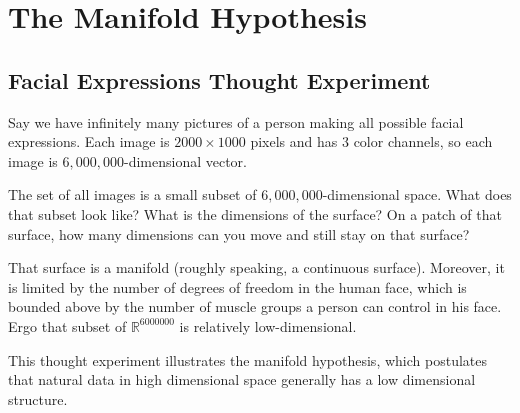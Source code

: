 \chapter{The Manifold Hypothesis}\label{chp: manifold_hypothesis}

\section{Facial Expressions Thought Experiment}

Say we have infinitely many pictures of a person making all possible facial expressions.
Each image is $2000 \times 1000$ pixels and has $3$ color channels, so each image is $6,000,000$-dimensional vector.

The set of all images is a small subset of $6,000,000$-dimensional space.
What does that subset look like?
What is the dimensions of the surface?
On a patch of that surface, how many dimensions can you move and still stay on that surface?

That surface is a manifold (roughly speaking, a continuous surface).
Moreover, it is limited by the number of degrees of freedom in the human face, which is bounded above by the number of muscle groups a person can control in his face.
Ergo that subset of $\mathbb{R}^{6000000}$ is relatively low-dimensional.

This thought experiment illustrates the manifold hypothesis, which postulates that natural data in high dimensional space generally has a low dimensional structure.